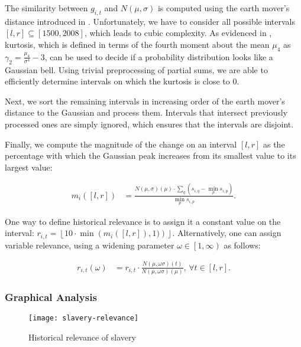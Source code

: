 The similarity between $g_{i, t}$ and $N \left( \mu, \sigma \right)$ is computed using the earth mover's distance introduced in . Unfortunately, we have to consider all possible intervals $\left[ l, r \right] \subseteq \left[ 1500, 2008 \right]$, which leads to cubic complexity. As evidenced in , kurtosis, which is defined in terms of the fourth moment about the mean $\mu_4$ as $\gamma_2 = \frac{\mu_4}{\sigma^4} - 3$, can be used to decide if a probability distribution looks like a Gaussian bell. Using trivial preprocessing of partial sums, we are able to efficiently determine intervals on which the kurtosis is close to $0$.

Next, we sort the remaining intervals in increasing order of the earth mover's distance to the Gaussian and process them. Intervals that intersect previously processed ones are simply ignored, which ensures that the intervals are disjoint.

Finally, we compute the magnitude of the change on an interval $\left[ l, r \right]$ as the percentage with which the Gaussian peak increases from its smallest value to its largest value:

\begin{align}
\label{eq:gaussian-magnitude}
m_i \left( \left[ l, r \right] \right) &= \frac{N \left( \mu, \sigma \right) \left( \mu \right) \cdot \sum_{q} \left( s_{i, q} - \min_{p} s_{i, p} \right)}{\min_{p} s_{i, p}}.
\end{align}

One way to define historical relevance is to assign it a constant value on the interval: $r_{i, t} = \left\lfloor 10 \cdot \min \left( m_i \left( \left[ l, r \right] \right), 1) \right) \right\rfloor$. Alternatively, one can assign variable relevance, using a widening parameter $\omega \in \left[ 1, \infty \right)$ as follows:

\begin{align}
\label{eq:gaussian-model-variable-relevance}
r_{i, t} \left( \omega \right) &= r_{i, t} \cdot \frac{N \left( \mu, \omega \sigma \right) \left( t \right)}{N \left( \mu, \omega \sigma \right) \left( \mu \right)}, \, \forall t \in \left[ l, r \right].
\end{align}

\subsubsection{Graphical Analysis}

\begin{figure}[t]
\centering
\texttt{[image: slavery-relevance]}
\caption{Historical relevance of slavery}
\label{fig:slavery-relevance}
\end{figure}

